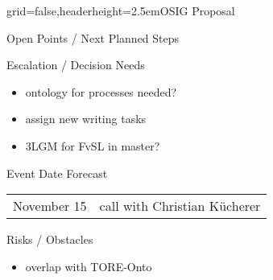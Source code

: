 \documentclass[english]{kiesgrube}
\begin{document}
\begin{poster}{grid=false,headerheight=2.5em}{}{OSIG Proposal}{}{}
\begin{posterbox}[name=open,column=1,below=description]{Open Points / Next Planned Steps}
\begin{enumerate}
\end{enumerate}
\end{posterbox}
\begin{posterbox}[name=escalation,column=1,below=open]{Escalation / Decision Needs}
\begin{itemize}
\item	ontology for processes needed?
\item	assign new writing tasks
\item	3LGM for FvSL in master?
\end{itemize}
\end{posterbox}
\begin{posterbox}[name=event,below=progress,]{Event Date Forecast}
\begin{tabulary}{\textwidth}{lL}
November 15	&call with Christian Kücherer\\	
\end{tabulary}
\end{posterbox}
\begin{posterbox}[name=event,below=event]{Risks / Obstacles}
\begin{itemize}
\item overlap with TORE-Onto
\end{itemize}
\end{posterbox}
\footer{}
\end{poster}

\newpage
\end{document}
